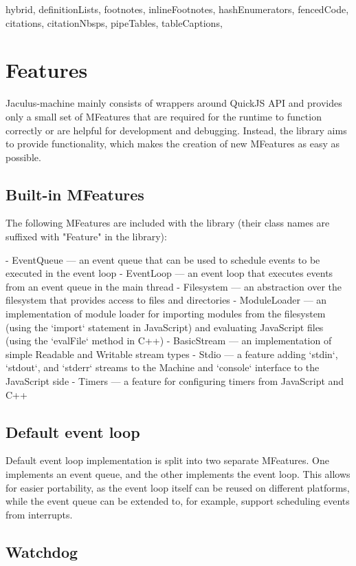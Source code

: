 \begin{markdown*}{%
  hybrid,
  definitionLists,
  footnotes,
  inlineFootnotes,
  hashEnumerators,
  fencedCode,
  citations,
  citationNbsps,
  pipeTables,
  tableCaptions,
}
\section{Features}

Jaculus-machine mainly consists of wrappers around QuickJS API and provides only a small set of MFeatures that are required for the runtime to function correctly or are helpful for development and debugging. Instead, the library aims to provide functionality, which makes the creation of new MFeatures as easy as possible.

\subsection{Built-in MFeatures}

The following MFeatures are included with the library (their class names are suffixed with "Feature" in the library):

  - EventQueue --- an event queue that can be used to schedule events to be executed in the event loop
  - EventLoop --- an event loop that executes events from an event queue in the main thread
  - Filesystem --- an abstraction over the filesystem that provides access to files and directories
  - ModuleLoader --- an implementation of module loader for importing modules from the filesystem (using the `import` statement in JavaScript) and evaluating JavaScript files (using the `evalFile` method in C++)
  - BasicStream --- an implementation of simple Readable and Writable stream types
  - Stdio --- a feature adding `stdin`, `stdout`, and `stderr` streams to the Machine and `console` interface to the JavaScript side
  - Timers --- a feature for configuring timers from JavaScript and C++

\subsection{Default event loop}

Default event loop implementation is split into two separate MFeatures. One implements an event queue, and the other implements the event loop. This allows for easier portability, as the event loop itself can be reused on different platforms, while the event queue can be extended to, for example, support scheduling events from interrupts.

\subsection{Watchdog}


\end{markdown*}
